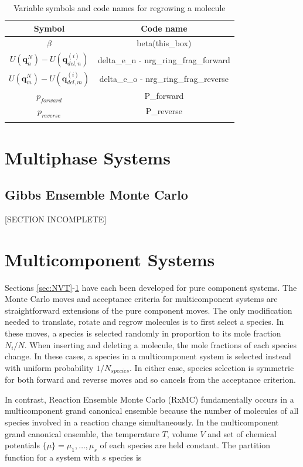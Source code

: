 \begin{table}
\caption{Variable symbols and code names for regrowing a molecule}
\label{table:cbmcRegrow}
\centering
\begin{tabular}{|c|c|} \hline
 {\bf Symbol} & {\bf Code name} \\ \hline
 $\beta$ & beta(this\_box) \\
 $U(\mathbf{q}^N_n) - U(\mathbf{q}^{(i)}_{del,n})$ & delta\_e\_n - nrg\_ring\_frag\_forward \\
 $U(\mathbf{q}^N_m) - U(\mathbf{q}^{(i)}_{del,m})$ & delta\_e\_o - nrg\_ring\_frag\_reverse \\
 $p_{forward}$ & P\_forward \\
 $p_{reverse}$ & P\_reverse \\
 \hline
\multicolumn{2}{c}{}
\end{tabular}
\end{table}

\section{Multiphase Systems}
\label{sec:multiphase}
\subsection{Gibbs Ensemble Monte Carlo} 
\label{sec:gibbs}

[SECTION INCOMPLETE]

\section{Multicomponent Systems} 

Sections \ref{sec:NVT}-\ref{sec:multiphase} have each been developed for pure component systems. The Monte Carlo moves and acceptance criteria for multicomponent systems are straightforward extensions of the pure component moves. The only modification needed to translate, rotate and regrow molecules is to first select a species. In these moves, a species is selected randomly in proportion to its mole fraction $N_i/N$. When inserting and deleting a molecule, the mole fractions of each species change. In these cases, a species in a multicomponent system is selected instead with uniform probability $1/N_{species}$. In either case, species selection is symmetric for both forward and reverse moves and so cancels from the acceptance criterion.

In contrast, Reaction Ensemble Monte Carlo (RxMC) fundamentally occurs in a multicomponent grand canonical ensemble because the number of molecules of all species involved in a reaction change simultaneously. In the multicomponent grand canonical ensemble, the temperature $T$, volume $V$ and set of chemical potentials $\{\mu\} = \mu_1, \ldots, \mu_s$ of each species are held constant. The partition function for a system with $s$ species is

